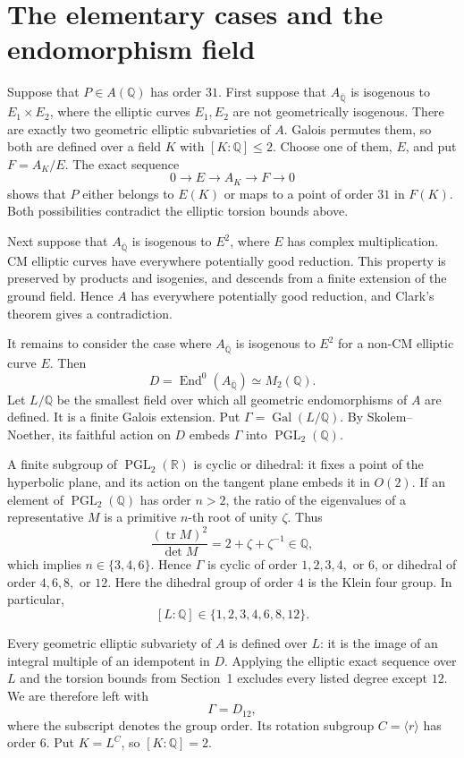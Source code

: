 \documentclass[11pt]{article}
\newcommand{\Q}{\mathbb Q}
\DeclareMathOperator{\End}{End}
\DeclareMathOperator{\Gal}{Gal}
\DeclareMathOperator{\PGL}{PGL}
\begin{document}
\section{The elementary cases and the endomorphism field}

Suppose that \(P\in A(\Q)\) has order \(31\).
First suppose that \(A_{\overline{\Q}}\) is isogenous to
\(E_1\times E_2\), where the elliptic curves \(E_1,E_2\) are not
geometrically isogenous. There are exactly two geometric elliptic
subvarieties of \(A\). Galois permutes them, so both are defined over
a field \(K\) with \([K:\Q]\leq2\). Choose one of them, \(E\),
and put \(F=A_K/E\). The exact sequence
\[
 0\longrightarrow E\longrightarrow A_K\longrightarrow F
 \longrightarrow0
\]
shows that \(P\) either belongs to \(E(K)\) or maps to a point of
order \(31\) in \(F(K)\). Both possibilities contradict the elliptic
torsion bounds above.

Next suppose that \(A_{\overline{\Q}}\) is isogenous to \(E^2\),
where \(E\) has complex multiplication. CM elliptic curves have
everywhere potentially good reduction. This property is preserved by
products and isogenies, and descends from a finite extension of the
ground field. Hence \(A\) has everywhere potentially good reduction,
and Clark's theorem gives a contradiction.

It remains to consider the case where \(A_{\overline{\Q}}\) is
isogenous to \(E^2\) for a non-CM elliptic curve \(E\). Then
\[
 D=\End^0(A_{\overline{\Q}})\simeq M_2(\Q).
\]
Let \(L/\Q\) be the smallest field over which all geometric
endomorphisms of \(A\) are defined. It is a finite Galois extension.
Put \(\Gamma=\Gal(L/\Q)\). By Skolem--Noether, its faithful action
on \(D\) embeds \(\Gamma\) into \(\PGL_2(\Q)\).

A finite subgroup of \(\PGL_2(\mathbb R)\) is cyclic or dihedral:
it fixes a point of the hyperbolic plane, and its action on the tangent
plane embeds it in \(O(2)\). If an element of \(\PGL_2(\Q)\) has
order \(n>2\), the ratio of the eigenvalues of a representative \(M\)
is a primitive \(n\)-th root of unity \(\zeta\). Thus
\[
 \frac{(\operatorname{tr}M)^2}{\det M}
 =2+\zeta+\zeta^{-1}\in\Q,
\]
which implies \(n\in\{3,4,6\}\). Hence \(\Gamma\) is cyclic of
order \(1,2,3,4,\) or \(6\), or dihedral of order \(4,6,8,\) or
\(12\). Here the dihedral group of order \(4\) is the Klein four
group. In particular,
\[
 [L:\Q]\in\{1,2,3,4,6,8,12\}.
\]

Every geometric elliptic subvariety of \(A\) is defined over \(L\):
it is the image of an integral multiple of an idempotent in \(D\).
Applying the elliptic exact sequence over \(L\) and the torsion
bounds from Section~1 excludes every listed degree except \(12\).
We are therefore left with
\[
 \Gamma=D_{12},
\]
where the subscript denotes the group order. Its rotation subgroup
\(C=\langle r\rangle\) has order \(6\). Put \(K=L^C\), so
\([K:\Q]=2\).
\end{document}

